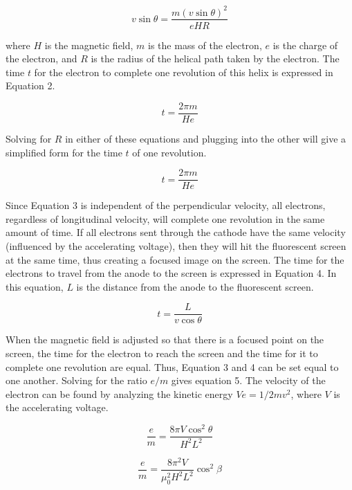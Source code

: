 \documentclass[%
 aip,
 amsmath,amssymb,
 reprint,%
floatfix,
]{revtex4-1}
\begin{document}
\begin{equation}
	v \sin{\theta} = \frac{m(v \sin{\theta})^2}{eHR}
\end{equation}
 
\noindent where $H$ is the magnetic field, $m$ is the mass of the electron, $e$ is the charge of the electron, and $R$ is the radius of the helical path taken by the electron. The time $t$ for the electron to complete one revolution of this helix is expressed in Equation 2.

\begin{equation}
	t = \frac{2 \pi m}{H e}
\end{equation}

\noindent Solving for $R$ in either of these equations and plugging into the other will give a simplified form for the time $t$ of one revolution.

\begin{equation}
	t = \frac{2 \pi m}{H e}
\end{equation}

\noindent Since Equation 3 is independent of the perpendicular velocity, all electrons, regardless of longitudinal velocity, will complete one revolution in the same amount of time. If all electrons sent through the cathode have the same velocity (influenced by the accelerating voltage), then they will hit the fluorescent screen at the same time, thus creating a focused image on the screen. The time for the electrons to travel from the anode to the screen is expressed in Equation 4. In this equation, $L$ is the distance from the anode to the fluorescent screen.

\begin{equation}
	t = \frac{L}{v \cos{\theta}}
\end{equation}

\noindent When the magnetic field is adjusted so that there is a focused point on the screen, the time for the electron to reach the screen and the time for it to complete one revolution are equal. Thus, Equation 3 and 4 can be set equal to one another. Solving for the ratio $e/m$ gives equation 5. The velocity of the electron can be found by analyzing the kinetic energy $V e = 1/2 m v^2$, where $V$ is the accelerating voltage.

\begin{equation}
	\frac{e}{m} = \frac{8 \pi V \cos^2{\theta}}{H^2 L^2}
\end{equation}

\begin{equation}
	\frac{e}{m} = \frac{8 \pi^2 V}{\mu_0^2 H^2 L^2} \cos^2{\beta}
\end{equation}
\end{document}
